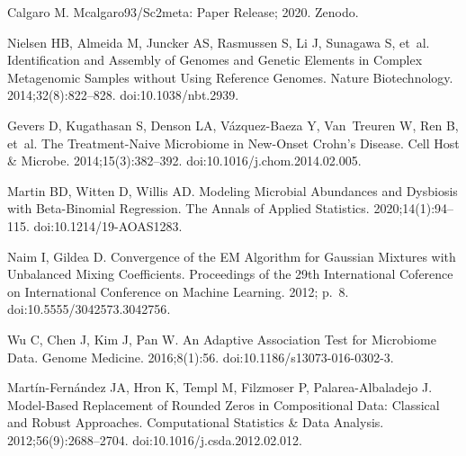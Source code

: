 \documentclass[10pt,letterpaper]{article}
\begin{document}
\begin{thebibliography}{10}
Calgaro M. Mcalgaro93/Sc2meta: {{Paper Release}}; 2020.
\newblock Zenodo.

Nielsen HB, Almeida M, Juncker AS, Rasmussen S, Li J, Sunagawa S, et~al.
\newblock Identification and Assembly of Genomes and Genetic Elements in
  Complex Metagenomic Samples without Using Reference Genomes.
\newblock Nature Biotechnology. 2014;32(8):822--828.
\newblock doi:{10.1038/nbt.2939}.

Gevers D, Kugathasan S, Denson LA, {V{\'a}zquez-Baeza} Y, Van~Treuren W, Ren B,
  et~al.
\newblock The {{Treatment}}-{{Naive Microbiome}} in {{New}}-{{Onset Crohn}}'s
  {{Disease}}.
\newblock Cell Host \& Microbe. 2014;15(3):382--392.
\newblock doi:{10.1016/j.chom.2014.02.005}.

Martin BD, Witten D, Willis AD.
\newblock Modeling Microbial Abundances and Dysbiosis with Beta-Binomial
  Regression.
\newblock The Annals of Applied Statistics. 2020;14(1):94--115.
\newblock doi:{10.1214/19-AOAS1283}.

Naim I, Gildea D.
\newblock Convergence of the {{EM Algorithm}} for {{Gaussian Mixtures}} with
  {{Unbalanced Mixing Coefficients}}.
\newblock Proceedings of the 29th International Coference on International
  Conference on Machine Learning. 2012; p.~8.
\newblock doi:{10.5555/3042573.3042756}.

Wu C, Chen J, Kim J, Pan W.
\newblock An Adaptive Association Test for Microbiome Data.
\newblock Genome Medicine. 2016;8(1):56.
\newblock doi:{10.1186/s13073-016-0302-3}.

{Mart{\'i}n-Fern{\'a}ndez} JA, Hron K, Templ M, Filzmoser P,
  {Palarea-Albaladejo} J.
\newblock Model-Based Replacement of Rounded Zeros in Compositional Data:
  {{Classical}} and Robust Approaches.
\newblock Computational Statistics \& Data Analysis. 2012;56(9):2688--2704.
\newblock doi:{10.1016/j.csda.2012.02.012}.

\end{thebibliography}
\end{document}
